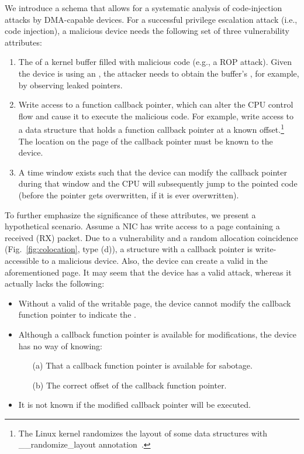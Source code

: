 We introduce a schema that allows for a systematic analysis of code-injection attacks by DMA-capable devices.
For a successful privilege escalation attack (i.e., code injection), a malicious device needs the following set of three vulnerability attributes:
\begin{enumerate}
    \item The \kva{} of a kernel buffer filled with malicious code (e.g., a ROP attack). Given the device is using an \iova, the attacker needs to obtain the buffer's \kva{}, for example, by observing leaked pointers. 
    \item Write access to a function callback pointer, which can alter the CPU control flow and cause it to execute the malicious code. For example, write access to a data structure that holds a function callback pointer at a known offset.\footnote{The Linux kernel randomizes the layout of some data structures with \_\_randomize\_layout annotation~\cite{rand_layout}.} The location on the page of the callback pointer must be known to the device.
    \item A time window exists such that the device can modify the callback pointer during that window and the CPU will subsequently jump to the pointed code (before the pointer gets overwritten, if it is ever overwritten).
\end{enumerate}

To further emphasize the significance of these attributes, we present a hypothetical scenario. Assume a NIC has write access to a page containing a received (RX) packet. Due to a \subpage{} vulnerability and a random allocation coincidence (Fig.~\ref{fig:colocation}, type (d)), a structure with a callback pointer is write-accessible to a malicious device. Also, the device can create a valid \mabaf{} in the aforementioned page. It may seem that the device has a valid attack, whereas it actually lacks the following:

\begin{itemize}
    \item Without a valid \kva{} of the writable page, the device cannot modify the callback function pointer to indicate the \mabaf.
    \item Although a callback function pointer is available for modifications, the device has no way of knowing: 
    \begin{enumerate}
        \item[(a)] That a callback function pointer is available for sabotage.
        \item[(b)] The correct offset of the callback function pointer.
    \end{enumerate}
    \item It is not known if the modified callback pointer will be executed.
\end{itemize}

